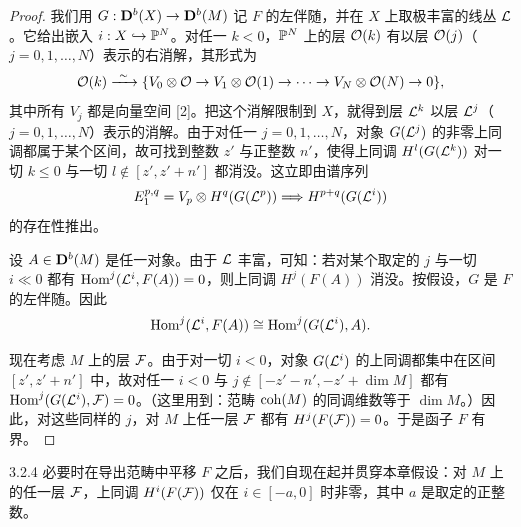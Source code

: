 \begin{proof}
我们用 $G:\mathbf{D}^{b}(X)\to\mathbf{D}^{b}(M)$ 记 $F$ 的左伴随，并在 $X$ 上取极丰富的线丛 $\mathcal{L}$。它给出嵌入 $i:X\hookrightarrow\mathbb{P}^{N}$。对任一 $k<0$，$\mathbb{P}^{N}$ 上的层 $\mathcal{O}(k)$ 有以层 $\mathcal{O}(j)$（$j=0,1,\ldots,N$）表示的右消解，其形式为
\begin{equation*}
\cO(k)\xrightarrow{\ \sim\ }\{V_{0}\otimes\cO\to V_{1}\otimes\cO(1)\to\cdots\to V_{N}\otimes\cO(N)\to 0\},
\end{equation*}
其中所有 $V_{j}$ 都是向量空间 [2]。把这个消解限制到 $X$，就得到层 $\mathcal{L}^{k}$ 以层 $\mathcal{L}^{j}$（$j=0,1,\ldots,N$）表示的消解。由于对任一 $j=0,1,\ldots,N$，对象 $G(\mathcal{L}^{j})$ 的非零上同调都属于某个区间，故可找到整数 $z'$ 与正整数 $n'$，使得上同调 $H^{l}(G(\mathcal{L}^{k}))$ 对一切 $k\leqslant 0$ 与一切 $l\notin[z',z'+n']$ 都消没。这立即由谱序列
\begin{equation*}
E_{1}^{p,q}=V_{p}\otimes H^{q}(G(\mathcal{L}^{p}))\Longrightarrow H^{p+q}(G(\mathcal{L}^{i}))
\end{equation*}
的存在性推出。


设 $A\in\mathbf{D}^{b}(M)$ 是任一对象。由于 $\mathcal{L}$ 丰富，可知：若对某个取定的 $j$ 与一切 $i\ll 0$ 都有 $\operatorname{Hom}^{j}(\mathcal{L}^{i},F(A))=0$，则上同调 $H^{j}(F(A))$ 消没。按假设，$G$ 是 $F$ 的左伴随。因此
\begin{equation*}
\operatorname{Hom}^{j}(\mathcal{L}^{i},F(A))\cong\operatorname{Hom}^{j}(G(\mathcal{L}^{i}),A).
\end{equation*}

现在考虑 $M$ 上的层 $\mathcal{F}$。由于对一切 $i<0$，对象 $G(\mathcal{L}^{i})$ 的上同调都集中在区间 $[z',z'+n']$ 中，故对任一 $i<0$ 与 $j\notin[-z'-n',-z'+\dim M]$ 都有 $\operatorname{Hom}^{j}(G(\mathcal{L}^{i}),\mathcal{F})=0$。（这里用到：范畴 $\mathrm{coh}(M)$ 的同调维数等于 $\dim M$。）因此，对这些同样的 $j$，对 $M$ 上任一层 $\mathcal{F}$ 都有 $H^{j}(F(\mathcal{F}))=0$。于是函子 $F$ 有界。
\end{proof}

\begin{remark}{3.2.4}
必要时在导出范畴中平移 $F$ 之后，我们自现在起并贯穿本章假设：对 $M$ 上的任一层 $\mathcal{F}$，上同调 $H^{i}(F(\mathcal{F}))$ 仅在 $i\in[-a,0]$ 时非零，其中 $a$ 是取定的正整数。
\end{remark}

